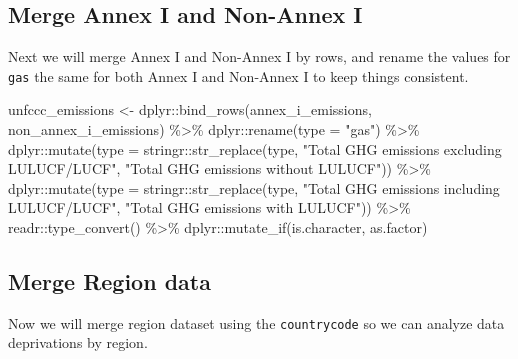 \documentclass[
  12pt,
]{article}
\newenvironment{Shaded}{}{}
\newcommand{\AttributeTok}[1]{\textcolor[rgb]{0.49,0.56,0.16}{#1}}
\newcommand{\FunctionTok}[1]{\textcolor[rgb]{0.02,0.16,0.49}{#1}}
\newcommand{\NormalTok}[1]{#1}
\newcommand{\OtherTok}[1]{\textcolor[rgb]{0.00,0.44,0.13}{#1}}
\newcommand{\SpecialCharTok}[1]{\textcolor[rgb]{0.25,0.44,0.63}{#1}}
\newcommand{\StringTok}[1]{\textcolor[rgb]{0.25,0.44,0.63}{#1}}
\begin{document}
\hypertarget{merge-annex-i-and-non-annex-i}{%
\subsection{Merge Annex I and Non-Annex
I}\label{merge-annex-i-and-non-annex-i}}

Next we will merge Annex I and Non-Annex I by rows, and rename the
values for \texttt{gas} the same for both Annex I and Non-Annex I to
keep things consistent.

\begin{Shaded}
\begin{Highlighting}[]
\NormalTok{unfccc\_emissions }\OtherTok{\textless{}{-}}\NormalTok{ dplyr}\SpecialCharTok{::}\FunctionTok{bind\_rows}\NormalTok{(annex\_i\_emissions, }
\NormalTok{    non\_annex\_i\_emissions) }\SpecialCharTok{\%\textgreater{}\%}
\NormalTok{    dplyr}\SpecialCharTok{::}\FunctionTok{rename}\NormalTok{(}\AttributeTok{type =} \StringTok{"gas"}\NormalTok{) }\SpecialCharTok{\%\textgreater{}\%}
\NormalTok{    dplyr}\SpecialCharTok{::}\FunctionTok{mutate}\NormalTok{(}\AttributeTok{type =}\NormalTok{ stringr}\SpecialCharTok{::}\FunctionTok{str\_replace}\NormalTok{(type, }
        \StringTok{"Total GHG emissions excluding LULUCF/LUCF"}\NormalTok{, }
        \StringTok{"Total GHG emissions without LULUCF"}\NormalTok{)) }\SpecialCharTok{\%\textgreater{}\%}
\NormalTok{    dplyr}\SpecialCharTok{::}\FunctionTok{mutate}\NormalTok{(}\AttributeTok{type =}\NormalTok{ stringr}\SpecialCharTok{::}\FunctionTok{str\_replace}\NormalTok{(type, }
        \StringTok{"Total GHG emissions including LULUCF/LUCF"}\NormalTok{, }
        \StringTok{"Total GHG emissions with LULUCF"}\NormalTok{)) }\SpecialCharTok{\%\textgreater{}\%}
\NormalTok{    readr}\SpecialCharTok{::}\FunctionTok{type\_convert}\NormalTok{() }\SpecialCharTok{\%\textgreater{}\%}
\NormalTok{    dplyr}\SpecialCharTok{::}\FunctionTok{mutate\_if}\NormalTok{(is.character, as.factor)}
\end{Highlighting}
\end{Shaded}

\hypertarget{merge-region-data}{%
\subsection{Merge Region data}\label{merge-region-data}}

Now we will merge region dataset using the \texttt{countrycode} so we
can analyze data deprivations by region.
\end{document}

